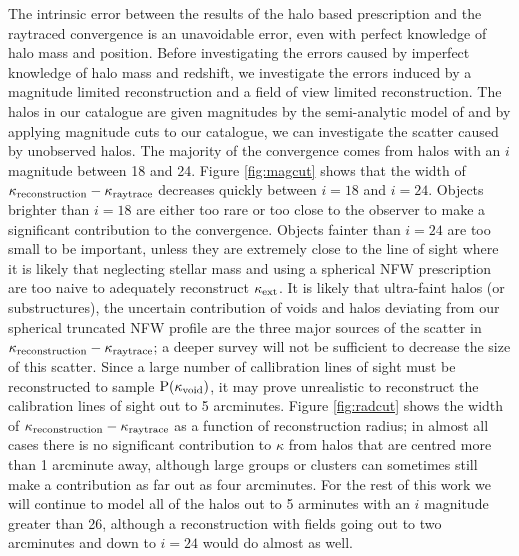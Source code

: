 \documentclass[useAMS,usenatbib]{mn2e}
\begin{document}
The intrinsic error between the results of the halo based prescription and the raytraced convergence is an unavoidable error, even with perfect knowledge of halo mass and position. Before investigating the errors caused by imperfect knowledge of halo mass and redshift, we investigate the errors induced by a magnitude limited reconstruction and a field of view limited reconstruction. The halos in our catalogue are given magnitudes by the semi-analytic model of \citet{deLucia+Blaizot2007} and by applying magnitude cuts to our catalogue, we can investigate the scatter caused by unobserved halos. The majority of the convergence comes from halos with an $i$ magnitude between 18 and 24. Figure \ref{fig:magcut} shows that the width of $\kappa_{\rm reconstruction}-\kappa_{\rm raytrace}$ decreases quickly between $i=18$ and $i=24$. Objects brighter than $i=18$ are either too rare or too close to the observer to make a significant contribution to the convergence. Objects fainter than $i=24$ are too small to be important, unless they are extremely close to the line of sight where it is likely that neglecting stellar mass and using a spherical NFW prescription are too naive to adequately reconstruct $\kappa_{\rm ext}$. It is likely that ultra-faint halos (or substructures), the uncertain contribution of voids and halos deviating from our spherical truncated NFW profile are the three major sources of the scatter in $\kappa_{\rm reconstruction}-\kappa_{\rm raytrace}$; a deeper survey will not be sufficient to decrease the size of this scatter. Since a large number of callibration lines of sight must be reconstructed to sample ${\rm P}(\kappa_{\rm void})$, it may prove unrealistic to reconstruct the calibration lines of sight out to 5 arcminutes. Figure \ref{fig:radcut} shows the width of $\kappa_{\rm reconstruction}-\kappa_{\rm raytrace}$ as a function of reconstruction radius; in almost all cases there is no significant contribution to $\kappa$ from halos that are centred more than 1 arcminute away, although large groups or clusters can sometimes still make a contribution as far out as four arcminutes. For the rest of this work we will continue to model all of the halos out to 5 arminutes with an $i$ magnitude greater than 26, although a reconstruction with fields going out to two arcminutes and down to $i=24$ would do almost as well.
\end{document}
